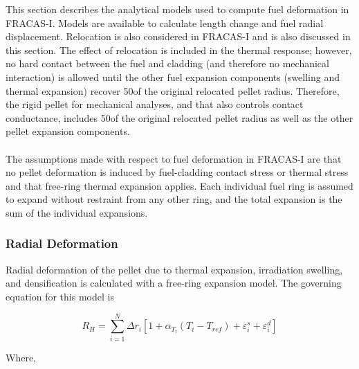 This section describes the analytical models used to compute fuel deformation in FRACAS-I. Models
are available to calculate length change and fuel radial displacement. Relocation is also considered
in FRACAS-I and is also discussed in this section. The effect of relocation is included in the
thermal response; however, no hard contact between the fuel and cladding (and therefore no
mechanical interaction) is allowed until the other fuel expansion components (swelling and thermal
expansion) recover 50\percent of the original relocated pellet radius.  Therefore, the rigid pellet
for mechanical analyses, and that also controls contact conductance, includes 50\percent of the
original relocated pellet radius as well as the other pellet expansion components.
\\
\\
The assumptions made with respect to fuel deformation in FRACAS-I are that no pellet deformation is
induced by fuel-cladding contact stress or thermal stress and that free-ring thermal expansion
applies. Each individual fuel ring is assumed to expand without restraint from any other ring, and
the total expansion is the sum of the individual expansions.
%
\subsubsection{Radial Deformation}\label{section:radial-deformation}

Radial deformation of the pellet due to thermal expansion, irradiation swelling, and densification
is calculated with a free-ring expansion model. The governing equation for this model is

\begin{equation}
    \label{eq:pellet_radial_deformation_model}
    R_{H} = \sum_{i = 1}^{N} \Delta r_{i} \left[1 + \alpha_{T_{i}} \left(T_{i} - T_{ref} \right) + \varepsilon_{i}^{s} + \varepsilon_{i}^{d}\right]
\end{equation}

Where,

